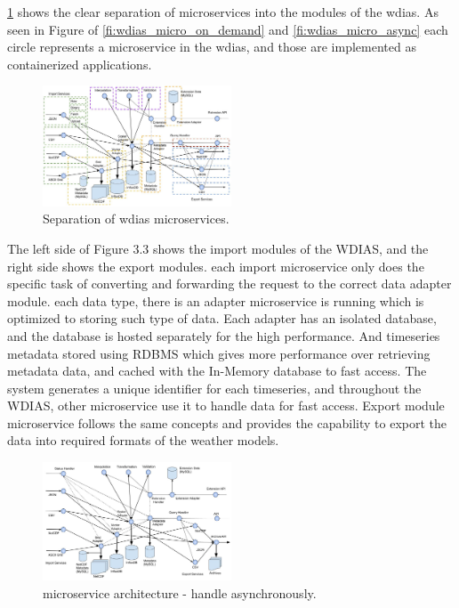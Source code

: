 \documentclass[conference]{IEEEtran}
\begin{document}
\cref{pfi:microservice_separation} shows the clear separation of microservices into the modules of the \acrshort{wdias}. As seen in Figure of \cref{fi:wdias_micro_on_demand} and \cref{fi:wdias_micro_async} each circle represents a microservice in the \acrshort{wdias}, and those are implemented as containerized applications. 

\begin{figure}[htbp]
\centerline{\includegraphics[width=0.5\textwidth]{method/microservice/separation_microservices-v3.jpg}}
\caption{Separation of \acrshort{wdias} microservices.}
\label{pfi:microservice_separation}
\end{figure}

The left side of Figure 3.3
shows the import modules of the WDIAS, and the right side shows the export modules. each import microservice only does the specific
task of converting and forwarding the request to the correct data adapter module. each data type, there is an adapter microservice is running which is optimized to storing
such type of data. Each adapter has an isolated database, and the database is hosted separately for the high performance.
And timeseries metadata stored using RDBMS which gives more performance over retrieving metadata data, and cached with the In-Memory database to fast access. The system
generates a unique identifier for each timeseries, and throughout the WDIAS, other
microservice use it to handle data for fast access.
Export module microservice follows the same concepts and provides the capability
to export the data into required formats of the weather models.

\begin{figure}[htbp]
\centerline{\includegraphics[width=0.5\textwidth]{method/microservice/microservice_architecture-handle_on_async-v3.jpg}}
\caption{microservice architecture - handle asynchronously.}
\label{pfi:microservice_architecture_async}
\end{figure}
\end{document}
